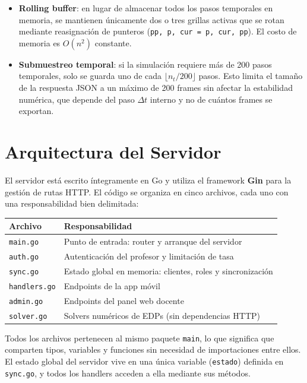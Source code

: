 \documentclass[12pt, a4paper]{article}
\begin{document}
\begin{itemize}
    \item \textbf{Rolling buffer}: en lugar de almacenar todos los pasos temporales en
    memoria, se mantienen únicamente dos o tres grillas activas que se rotan mediante
    reasignación de punteros (\texttt{pp, p, cur = p, cur, pp}). El costo de memoria
    es $O(n^2)$ constante.

    \item \textbf{Submuestreo temporal}: si la simulación requiere más de 200 pasos
    temporales, solo se guarda uno de cada $\lfloor n_t / 200 \rfloor$ pasos. Esto
    limita el tamaño de la respuesta JSON a un máximo de 200 frames sin afectar la
    estabilidad numérica, que depende del paso $\Delta t$ interno y no de cuántos
    frames se exportan.
\end{itemize}

\newpage

\section{Arquitectura del Servidor}

El servidor está escrito íntegramente en Go y utiliza el framework \textbf{Gin} para la
gestión de rutas HTTP. El código se organiza en cinco archivos, cada uno con una
responsabilidad bien delimitada:

\begin{center}
\begin{tabular}{ll}
\toprule
\textbf{Archivo} & \textbf{Responsabilidad} \\
\midrule
\texttt{main.go}     & Punto de entrada: router y arranque del servidor \\
\texttt{auth.go}     & Autenticación del profesor y limitación de tasa \\
\texttt{sync.go}     & Estado global en memoria: clientes, roles y sincronización \\
\texttt{handlers.go} & Endpoints de la app móvil \\
\texttt{admin.go}    & Endpoints del panel web docente \\
\texttt{solver.go}   & Solvers numéricos de EDPs (sin dependencias HTTP) \\
\bottomrule
\end{tabular}
\end{center}

Todos los archivos pertenecen al mismo paquete \texttt{main}, lo que significa que
comparten tipos, variables y funciones sin necesidad de importaciones entre ellos. El
estado global del servidor vive en una única variable (\texttt{estado}) definida en
\texttt{sync.go}, y todos los handlers acceden a ella mediante sus métodos.
\end{document}
